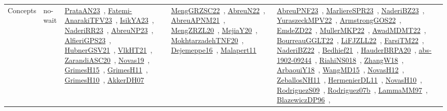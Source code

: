 {\begin{longtable}{lp{3cm}>{\raggedright\arraybackslash}p{6cm}>{\raggedright\arraybackslash}p{6cm}>{\raggedright\arraybackslash}p{8cm}}
Concepts & no-wait & \href{../works/PrataAN23.pdf}{PrataAN23}~\cite{PrataAN23}, \href{../works/Fatemi-AnarakiTFV23.pdf}{Fatemi-AnarakiTFV23}~\cite{Fatemi-AnarakiTFV23}, \href{../works/IsikYA23.pdf}{IsikYA23}~\cite{IsikYA23}, \href{../works/NaderiRR23.pdf}{NaderiRR23}~\cite{NaderiRR23}, \href{../works/AbreuNP23.pdf}{AbreuNP23}~\cite{AbreuNP23}, \href{../works/AlfieriGPS23.pdf}{AlfieriGPS23}~\cite{AlfieriGPS23}, \href{../works/HubnerGSV21.pdf}{HubnerGSV21}~\cite{HubnerGSV21}, \href{../works/VlkHT21.pdf}{VlkHT21}~\cite{VlkHT21}, \href{../works/ZarandiASC20.pdf}{ZarandiASC20}~\cite{ZarandiASC20}, \href{../works/Novas19.pdf}{Novas19}~\cite{Novas19}, \href{../works/GrimesH15.pdf}{GrimesH15}~\cite{GrimesH15}, \href{../works/GrimesH11.pdf}{GrimesH11}~\cite{GrimesH11}, \href{../works/GrimesH10.pdf}{GrimesH10}~\cite{GrimesH10}, \href{../works/AkkerDH07.pdf}{AkkerDH07}~\cite{AkkerDH07} & \href{../works/MengGRZSC22.pdf}{MengGRZSC22}~\cite{MengGRZSC22}, \href{../works/AbreuN22.pdf}{AbreuN22}~\cite{AbreuN22}, \href{../works/AbreuAPNM21.pdf}{AbreuAPNM21}~\cite{AbreuAPNM21}, \href{../works/MengZRZL20.pdf}{MengZRZL20}~\cite{MengZRZL20}, \href{../works/MejiaY20.pdf}{MejiaY20}~\cite{MejiaY20}, \href{../works/MokhtarzadehTNF20.pdf}{MokhtarzadehTNF20}~\cite{MokhtarzadehTNF20}, \href{../works/Dejemeppe16.pdf}{Dejemeppe16}~\cite{Dejemeppe16}, \href{../works/Malapert11.pdf}{Malapert11}~\cite{Malapert11} & \href{../works/AbreuPNF23.pdf}{AbreuPNF23}~\cite{AbreuPNF23}, \href{../works/MarliereSPR23.pdf}{MarliereSPR23}~\cite{MarliereSPR23}, \href{../works/NaderiBZ23.pdf}{NaderiBZ23}~\cite{NaderiBZ23}, \href{../works/YuraszeckMPV22.pdf}{YuraszeckMPV22}~\cite{YuraszeckMPV22}, \href{../works/ArmstrongGOS22.pdf}{ArmstrongGOS22}~\cite{ArmstrongGOS22}, \href{../works/EmdeZD22.pdf}{EmdeZD22}~\cite{EmdeZD22}, \href{../works/MullerMKP22.pdf}{MullerMKP22}~\cite{MullerMKP22}, \href{../works/AwadMDMT22.pdf}{AwadMDMT22}~\cite{AwadMDMT22}, \href{../works/BourreauGGLT22.pdf}{BourreauGGLT22}~\cite{BourreauGGLT22}, \href{../works/LiFJZLL22.pdf}{LiFJZLL22}~\cite{LiFJZLL22}, \href{../works/FarsiTM22.pdf}{FarsiTM22}~\cite{FarsiTM22}, \href{../works/NaderiBZ22.pdf}{NaderiBZ22}~\cite{NaderiBZ22}, \href{../works/Bedhief21.pdf}{Bedhief21}~\cite{Bedhief21}, \href{../works/HauderBRPA20.pdf}{HauderBRPA20}~\cite{HauderBRPA20}, \href{../works/abs-1902-09244.pdf}{abs-1902-09244}~\cite{abs-1902-09244}, \href{../works/RiahiNS018.pdf}{RiahiNS018}~\cite{RiahiNS018}, \href{../works/ZhangW18.pdf}{ZhangW18}~\cite{ZhangW18}, \href{../works/ArbaouiY18.pdf}{ArbaouiY18}~\cite{ArbaouiY18}, \href{../works/WangMD15.pdf}{WangMD15}~\cite{WangMD15}, \href{../works/NovasH12.pdf}{NovasH12}~\cite{NovasH12}, \href{../works/ZeballosNH11.pdf}{ZeballosNH11}~\cite{ZeballosNH11}, \href{../works/HermenierDL11.pdf}{HermenierDL11}~\cite{HermenierDL11}, \href{../works/NovasH10.pdf}{NovasH10}~\cite{NovasH10}, \href{../works/RodriguezS09.pdf}{RodriguezS09}~\cite{RodriguezS09}, \href{../works/Rodriguez07b.pdf}{Rodriguez07b}~\cite{Rodriguez07b}, \href{../works/LammaMM97.pdf}{LammaMM97}~\cite{LammaMM97}, \href{../works/BlazewiczDP96.pdf}{BlazewiczDP96}~\cite{BlazewiczDP96}, 
\end{longtable}}
